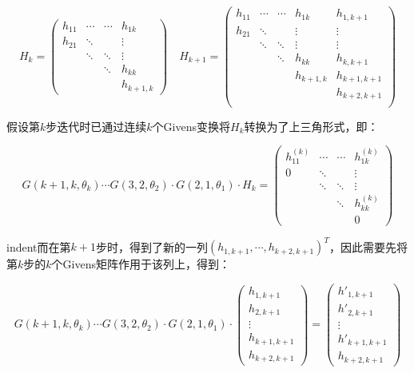 \documentclass[UTF8,nofonts]{ctexart}
\begin{document}
\begin{equation}
\label{eq:hkhk1}
H_{k}=
\begin{pmatrix}
	h_{11} & \cdots & \cdots & h_{1k} \\
	h_{21} & \ddots & & \vdots \\
	& \ddots & \ddots & \vdots \\
	& & \ddots & h_{kk} \\
	& & & h_{k+1,k}
\end{pmatrix}\quad
H_{k+1}=
\begin{pmatrix}
	h_{11} & \cdots & \cdots & h_{1k} & h_{1,k+1}\\
	h_{21} & \ddots & & \vdots & \vdots \\
	& \ddots & \ddots & \vdots & \vdots \\
	& & \ddots & h_{kk} & h_{k,k+1} \\
	& & & h_{k+1,k} & h_{k+1,k+1} \\
	& & & & h_{k+2,k+1} \\
\end{pmatrix}
\end{equation}

假设第$k$步迭代时已通过连续$k$个Givens变换将$H_{k}$转换为了上三角形式，即：

\[
G(k+1,k,\theta_k) \cdots G(3,2,\theta_2) \cdot G(2,1,\theta_1) \cdot H_{k}=
\begin{pmatrix}
	h_{11}^{(k)} & \cdots & \cdots & h_{1k}^{(k)} \\
	0 & \ddots & & \vdots \\
	& \ddots & \ddots & \vdots \\
	& & \ddots & h_{kk}^{(k)} \\
	& & & 0
\end{pmatrix}
\]

indent而在第$k+1$步时，得到了新的一列$(h_{1,k+1},\cdots,h_{k+2,k+1})^T$，因此需要先将第$k$步的$k$个Givens矩阵作用于该列上，得到：

\begin{equation}
\label{eq:gk1}
G(k+1,k,\theta_k) \cdots G(3,2,\theta_2) \cdot G(2,1,\theta_1) \cdot
\begin{pmatrix}
	h_{1,k+1} \\ h_{2,k+1} \\ \vdots \\ h_{k+1,k+1} \\ h_{k+2,k+1}
\end{pmatrix} =
\begin{pmatrix}
	h'_{1,k+1} \\ h'_{2,k+1} \\ \vdots \\ h'_{k+1,k+1} \\ h_{k+2,k+1}
\end{pmatrix}
\end{equation}
\end{document}
